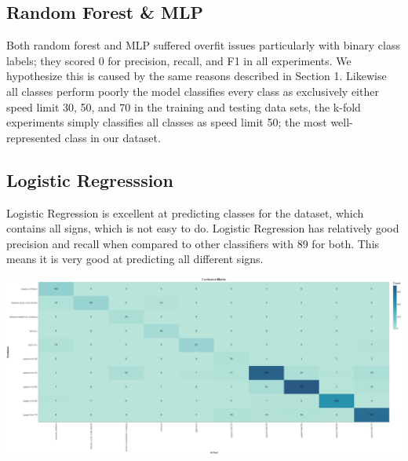 \documentclass[11pt]{article}
\begin{document}
\subsection{Random Forest \& MLP}
Both random forest and MLP suffered overfit issues particularly with binary class labels; they scored 0 for precision, recall, and F1 in all experiments. We hypothesize this is caused by the same reasons described in Section 1. Likewise all classes perform poorly the model classifies every class as exclusively either speed limit 30, 50, and 70 in the training and testing data sets, the k-fold experiments simply classifies all classes as speed limit 50; the most well-represented class in our dataset. 

\subsection{Logistic Regresssion}
Logistic Regression is excellent at predicting classes for the dataset, which contains all signs, which is not easy to do. Logistic Regression has relatively good precision and recall when compared to other classifiers with 89 for both. This means it is very good at predicting all different signs.

\begin{center}
  \includegraphics [width = \textwidth, height = 0.3\textheight, keepaspectratio]{Images/LRConfMat.png}
\end{center}
\end{document}
